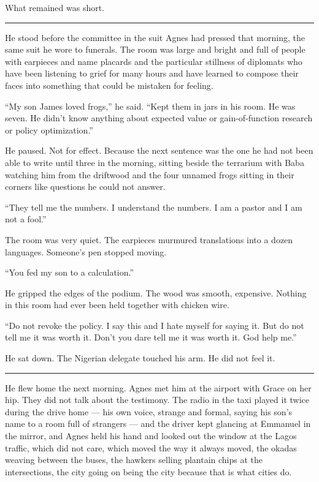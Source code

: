 What remained was short.

\begin{center}\rule{0.3\linewidth}{0.4pt}\end{center}

He stood before the committee in the suit Agnes had pressed that morning, the same suit he wore to funerals. The room was large and bright and full of people with earpieces and name placards and the particular stillness of diplomats who have been listening to grief for many hours and have learned to compose their faces into something that could be mistaken for feeling.

``My son James loved frogs,'' he said. ``Kept them in jars in his room. He was seven. He didn't know anything about expected value or gain-of-function research or policy optimization.''

He paused. Not for effect. Because the next sentence was the one he had not been able to write until three in the morning, sitting beside the terrarium with Baba watching him from the driftwood and the four unnamed frogs sitting in their corners like questions he could not answer.

``They tell me the numbers. I understand the numbers. I am a pastor and I am not a fool.''

The room was very quiet. The earpieces murmured translations into a dozen languages. Someone's pen stopped moving.

``You fed my son to a calculation.''

He gripped the edges of the podium. The wood was smooth, expensive. Nothing in this room had ever been held together with chicken wire.

``Do not revoke the policy. I say this and I hate myself for saying it. But do not tell me it was worth it. Don't you dare tell me it was worth it. God help me.''

He sat down. The Nigerian delegate touched his arm. He did not feel it.

\begin{center}\rule{0.3\linewidth}{0.4pt}\end{center}

He flew home the next morning. Agnes met him at the airport with Grace on her hip. They did not talk about the testimony. The radio in the taxi played it twice during the drive home --- his own voice, strange and formal, saying his son's name to a room full of strangers --- and the driver kept glancing at Emmanuel in the mirror, and Agnes held his hand and looked out the window at the Lagos traffic, which did not care, which moved the way it always moved, the okadas weaving between the buses, the hawkers selling plantain chips at the intersections, the city going on being the city because that is what cities do.

